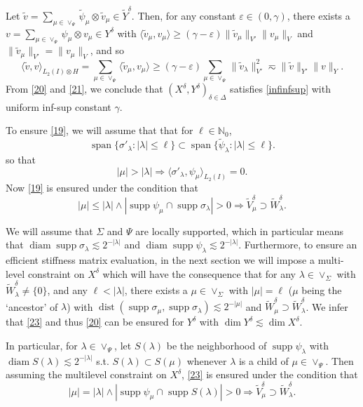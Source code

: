 \documentclass{amsart}
\theoremstyle{definition}
\theoremstyle{remark}
\numberwithin{equation}{section}
\newcommand{\eps}{\varepsilon}
\newcommand{\N}{\mathbb N}
\DeclareMathOperator{\supp}{supp}
\DeclareMathOperator{\diam}{diam}
\DeclareMathOperator{\dist}{dist}
\DeclareMathOperator{\Span}{span}
\newcommand{\be}{\begin{equation}}
\newcommand{\ee}{\end{equation}}
\newcommand{\1}{\mathbb 1}
\begin{document}
Let $\tilde v=\sum_{\mu \in \vee_\Psi} \tilde{\psi}_\mu \otimes \tilde{v}_\mu \in \tilde{Y}^\delta$.
Then, for any constant $\eps\in (0,\gamma)$, there exists a $v=\sum_{\mu \in \vee_\Psi} \psi_\mu \otimes v_\mu \in Y^\delta$  with $\langle \tilde v_\mu,v_\mu\rangle \geq (\gamma-\eps) \|\tilde{v}_\mu\|_{V'} \|v_\mu\|_V$ and $\|\tilde{v}_\mu\|_{V'}= \|v_\mu\|_V$, and so
\be \label{21}
\langle\tilde v, v\rangle_{L_2(I)\otimes H}
= \sum_{\mu \in \vee_\Psi} \langle \tilde{v}_\mu,v_\mu\rangle \geq (\gamma-\eps) 
\sum_{\mu \in \vee_\Psi} \|\tilde{v}_\lambda\|_{V'}^2
\eqsim \|\tilde v\|_{Y'} \|v\|_Y.
\ee
From \eqref{20} and \eqref{21}, we conclude that $(X^\delta,Y^\delta)_{\delta \in \Delta}$ satisfies \eqref{infinfsup} with uniform inf-sup constant $\gamma$.

To ensure \eqref{19}, we will assume that 
that for  $\ell \in \N_0$,
$$
\Span\{\sigma'_\lambda\colon |\lambda|\leq \ell\} \subset \Span\{\tilde{\psi}_\lambda\colon |\lambda|\leq \ell\}.
$$
 so that
\be \label{22}
|\mu| >|\lambda| \Longrightarrow \langle \sigma'_\lambda,\psi_\mu\rangle_{L_2(I)}=0.
\ee
Now \eqref{19} is ensured under the condition that
\be \label{23}
|\mu| \leq |\lambda| \wedge|\supp \psi_\mu \cap \supp \sigma_\lambda|>0 \Longrightarrow \tilde{V}^\delta_\mu \supset  \tilde{W}^\delta_\lambda.
\ee

We will assume that $\Sigma$ and $\Psi$ are locally supported, which in particular means that
$\diam \supp \sigma_\lambda \lesssim 2^{-|\lambda|}$ and $\diam \supp \psi_\lambda \lesssim 2^{-|\lambda|}$.
Furthermore, to ensure an efficient stiffness matrix evaluation, in the next section we will impose a multi-level constraint on $X^\delta$ which will have the consequence
that for any $\lambda \in \vee_\Sigma$ with $\tilde{W}_\lambda^\delta \neq \{0\}$, and any $\ell <|\lambda|$, there exists a $\mu \in \vee_\Sigma$ with $|\mu|=\ell$ ($\mu$ being the `ancestor' of $\lambda$)
with $\dist(\supp \sigma_\mu,\supp \sigma_\lambda)\lesssim 2^{-|\mu|}$ and $\tilde{W}_\mu^\delta \supset \tilde{W}_\lambda^\delta$.
We infer that \eqref{23} and thus \eqref{20} can be ensured for $Y^\delta$ with $\dim Y^\delta \lesssim \dim X^\delta$.

In particular, for $\lambda \in \vee_\Psi$, let $S(\lambda)$ be the neighborhood of $\supp \psi_\lambda$ with $\diam S(\lambda) \lesssim 2^{-|\lambda|}$ s.t. $S(\lambda) \subset S(\mu)$ whenever $\lambda$ is a child of $\mu \in \vee_\Psi$.
Then assuming the multilevel constraint on $X^\delta$, \eqref{23} is ensured under the condition that
\be \label{24}
|\mu| = |\lambda| \wedge|\supp \psi_\mu \cap \supp S(\lambda)|>0 \Longrightarrow \tilde{V}^\delta_\mu \supset  \tilde{W}^\delta_\lambda.
\ee
\end{document}
